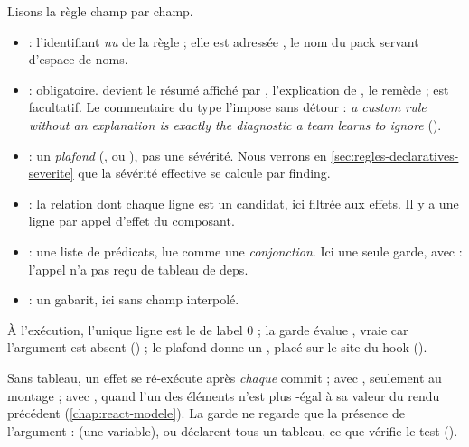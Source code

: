 Lisons la règle champ par champ.
\begin{itemize}
  \item {} : l'identifiant \emph{nu} de la règle ; elle est adressée , le nom du pack servant d'espace de noms.
  \item {} : obligatoire.  devient le résumé affiché par ,  l'explication de ,  le remède ;  est facultatif. Le commentaire du type l'impose sans détour : \og \emph{a custom rule without an explanation is exactly the diagnostic a team learns to ignore}\fg{} ().
  \item {} : un \emph{plafond} (,  ou ), pas une sévérité. Nous verrons en \cref{sec:regles-declaratives-severite} que la sévérité effective se calcule par finding.
  \item {} : la relation dont chaque ligne est un candidat, ici  filtrée aux effets. Il y a une ligne par appel d'effet du composant.
  \item {} : une liste de prédicats, lue comme une \emph{conjonction}. Ici une seule garde,  avec  : \og l'appel n'a pas reçu de tableau de deps\fg{}.
  \item {} : un gabarit, ici sans champ interpolé.
\end{itemize}
À l'exécution, l'unique ligne est le  de label 0 ; la garde évalue , vraie car l'argument est absent () ; le plafond  donne un \Warning{}, placé sur le site du hook (\og {}\fg{}).

\begin{react}
Sans tableau, un effet se ré-exécute après \emph{chaque} commit ; avec \code{[]}, seulement au montage ; avec \code{[a, b]}, quand l'un des éléments n'est plus -égal à sa valeur du rendu précédent (\cref{chap:react-modele}). La garde  ne regarde que la présence de l'argument :  (une variable), \code{[]} ou  déclarent tous un tableau, ce que vérifie le test  ().
\end{react}

